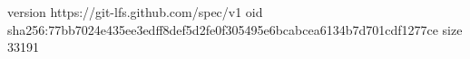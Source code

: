 version https://git-lfs.github.com/spec/v1
oid sha256:77bb7024e435ee3edff8def5d2fe0f305495e6bcabcea6134b7d701cdf1277ce
size 33191
